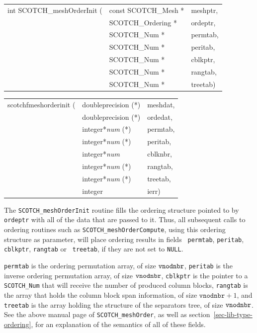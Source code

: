 \begin{itemize}
\progsyn

{\tt\begin{tabular}{l@{}ll}
int SCOTCH\_meshOrderInit ( & const SCOTCH\_Mesh * & meshptr, \\
                            & SCOTCH\_Ordering *   & ordeptr, \\
                            & SCOTCH\_Num *        & permtab, \\
                            & SCOTCH\_Num *        & peritab, \\
                            & SCOTCH\_Num *        & cblkptr, \\
                            & SCOTCH\_Num *        & rangtab, \\
                            & SCOTCH\_Num *        & treetab)
\end{tabular}}

{\tt\begin{tabular}{l@{}ll}
scotchfmeshorderinit ( & doubleprecision (*)   & meshdat, \\
                       & doubleprecision (*)   & ordedat, \\
                       & integer*{\it num} (*) & permtab, \\
                       & integer*{\it num} (*) & peritab, \\
                       & integer*{\it num}     & cblknbr, \\
                       & integer*{\it num} (*) & rangtab, \\
                       & integer*{\it num} (*) & treetab, \\
                       & integer               & ierr)
\end{tabular}}

\progdes

The {\tt SCOTCH\_mesh\lbt Order\lbt Init} routine fills the ordering
structure pointed to by {\tt ordeptr} with all of the data that are
passed to it. Thus, all subsequent calls to ordering routines such as
{\tt SCOTCH\_\lbt mesh\lbt Order\lbt Compute}, using this ordering
structure as parameter, will place ordering results in fields {\tt
permtab}, {\tt peritab}, {\tt *cblkptr}, {\tt rangtab} or {\tt
treetab}, if they are not set to {\tt NULL}.

{\tt permtab} is the ordering permutation array, of size ${\tt
vnodnbr}$, {\tt peritab} is the inverse ordering permutation array,
of size ${\tt vnodnbr}$, {\tt cblkptr} is the pointer to a
{\tt SCOTCH\_\lbt Num} that will receive the number of produced
column blocks, {\tt rangtab} is the array that holds the column block
span information, of size $\mathtt{vnodnbr} + 1$, and {\tt treetab}
is the array holding the structure of the separators tree, of size
${\tt vnodnbr}$. See the above manual page of
{\tt SCOTCH\_mesh\lbt Order}, as well as
section~\ref{sec-lib-type-ordering}, for an explanation of the
semantics of all of these fields.


\end{itemize}
